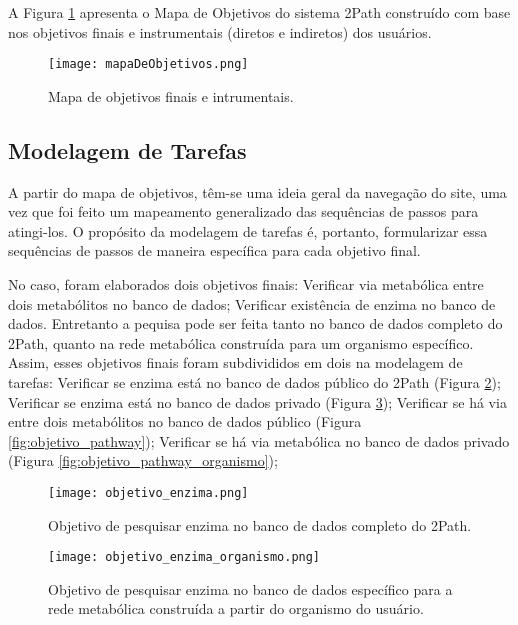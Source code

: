 \indent A Figura \ref{fig:mapaDeObjetivos} apresenta o Mapa de Objetivos do sistema 2Path construído com base nos objetivos finais e instrumentais (diretos e indiretos) dos usuários. 

\begin{figure}[!h] 
	\centering
	\texttt{[image: mapaDeObjetivos.png]}
	\caption{Mapa de objetivos finais e intrumentais.}
	\label{fig:mapaDeObjetivos}
\end{figure} 

\subsection{Modelagem de Tarefas}

\indent A partir do mapa de objetivos, têm-se uma ideia geral da navegação do site, uma vez que foi feito um mapeamento generalizado das sequências de passos para atingi-los. O propósito da modelagem de tarefas é, portanto, formularizar essa sequências de passos de maneira específica para cada objetivo final. 

\indent No caso, foram elaborados dois objetivos finais: Verificar via metabólica entre dois metabólitos no banco de dados; Verificar existência de enzima no banco de dados. Entretanto a pequisa pode ser feita tanto no banco de dados completo do 2Path, quanto na rede metabólica construída para um organismo específico. Assim, esses objetivos finais foram subdivididos em dois na modelagem de tarefas: Verificar se enzima está no banco de dados público do 2Path (Figura \ref{fig:objetivo_enzyma}); Verificar se enzima está no banco de dados privado (Figura \ref{fig:objetivo_enzyma_organismo}); Verificar se há via entre dois metabólitos no banco de dados público (Figura \ref{fig:objetivo_pathway}); Verificar se há via metabólica no banco de dados privado (Figura \ref{fig:objetivo_pathway_organismo});

\begin{figure}[!h]
    \centering
    \texttt{[image: objetivo\_enzima.png]}
    \caption{Objetivo de pesquisar enzima no banco de dados completo do 2Path.}
    \label{fig:objetivo_enzyma}
\end{figure}

\newpage
\begin{figure}[!h]
    \centering
    \texttt{[image: objetivo\_enzima\_organismo.png]}
    \caption{Objetivo de pesquisar enzima no banco de dados específico para a rede metabólica construída a partir do organismo do usuário.}
    \label{fig:objetivo_enzyma_organismo}
\end{figure}

